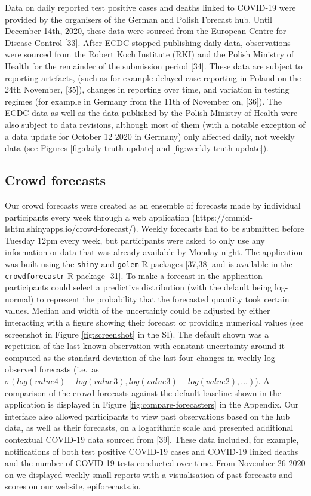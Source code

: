 \documentclass[10pt,letterpaper]{article}
\begin{document}
Data on daily reported test positive cases and deaths linked to COVID-19
were provided by the organisers of the German and Polish Forecast hub.
Until December 14th, 2020, these data were sourced from the European
Centre for Disease Control {[}33{]}. After ECDC stopped publishing daily
data, observations were sourced from the Robert Koch Institute (RKI) and
the Polish Ministry of Health for the remainder of the submission period
{[}34{]}. These data are subject to reporting artefacts, (such as for
example delayed case reporting in Poland on the 24th November,
{[}35{]}), changes in reporting over time, and variation in testing
regimes (for example in Germany from the 11th of November on, {[}36{]}).
The ECDC data as well as the data published by the Polish Ministry of
Health were also subject to data revisions, although most of them (with
a notable exception of a data update for October 12 2020 in Germany)
only affected daily, not weekly data (see Figures
\ref{fig:daily-truth-update} and \ref{fig:weekly-truth-update}).

\hypertarget{crowd-forecasts}{%
\subsection{Crowd forecasts}\label{crowd-forecasts}}

Our crowd forecasts were created as an ensemble of forecasts made by
individual participants every week through a web application
(https://cmmid-lshtm.shinyapps.io/crowd-forecast/). Weekly forecasts had
to be submitted before Tuesday 12pm every week, but participants were
asked to only use any information or data that was already available by
Monday night. The application was built using the \texttt{shiny} and
\texttt{golem} R packages {[}37,38{]} and is available in the
\texttt{crowdforecastr} R package {[}31{]}. To make a forecast in the
application participants could select a predictive distribution (with
the default being log-normal) to represent the probability that the
forecasted quantity took certain values. Median and width of the
uncertainty could be adjusted by either interacting with a figure
showing their forecast or providing numerical values (see screenshot in
Figure \ref{fig:screenshot} in the SI). The default shown was a
repetition of the last known observation with constant uncertainty
around it computed as the standard deviation of the last four changes in
weekly log observed forecasts (i.e.~as
\(\sigma(log(value4) - log(value3), log(value3) - log(value2), \ldots )\)).
A comparison of the crowd forecasts against the default baseline shown
in the application is displayed in Figure \ref{fig:compare-forecasters}
in the Appendix. Our interface also allowed participants to view past
observations based on the hub data, as well as their forecasts, on a
logarithmic scale and presented additional contextual COVID-19 data
sourced from {[}39{]}. These data included, for example, notifications
of both test positive COVID-19 cases and COVID-19 linked deaths and the
number of COVID-19 tests conducted over time. From November 26 2020 on
we displayed weekly small reports with a visualisation of past forecasts
and scores on our website, epiforecasts.io.
\end{document}
